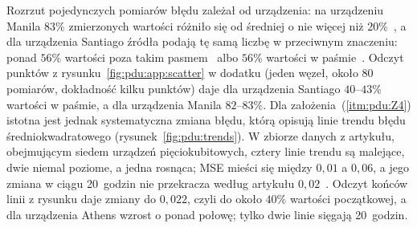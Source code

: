 Rozrzut pojedynczych pomiarów błędu zależał od urządzenia: na urządzeniu Manila $83\%$ zmierzonych wartości różniło się od średniej o nie więcej niż $20\%$~\cite{werner_experiment_driven_2022,werner_magisterka_2022}, a dla urządzenia Santiago źródła podają tę samą liczbę w przeciwnym znaczeniu: ponad $56\%$ wartości poza takim pasmem~\cite{werner_experiment_driven_2022} albo $56\%$ wartości w paśmie~\cite{werner_magisterka_2022}.
Odczyt punktów z rysunku~\ref{fig:pdu:app:scatter} w dodatku (jeden węzeł, około $80$ pomiarów, dokładność kilku punktów) daje dla urządzenia Santiago $40$--$43\%$ wartości w paśmie, a dla urządzenia Manila $82$--$83\%$.
%
Dla założenia~(\ref{itm:pdu:Z4}) istotna jest jednak systematyczna zmiana błędu, którą opisują linie trendu błędu średniokwadratowego (rysunek~\ref{fig:pdu:trends}).
W zbiorze danych z artykułu, obejmującym siedem urządzeń pięciokubitowych, cztery linie trendu są malejące, dwie niemal poziome, a jedna rosnąca; MSE mieści się między $0{,}01$ a $0{,}06$, a jego zmiana w ciągu 20~godzin nie przekracza według artykułu $0{,}02$~\cite{werner_experiment_driven_2022}.
Odczyt końców linii z rysunku daje zmiany do $0{,}022$, czyli do około $40\%$ wartości początkowej, a dla urządzenia Athens wzrost o ponad połowę; tylko dwie linie sięgają 20~godzin.
